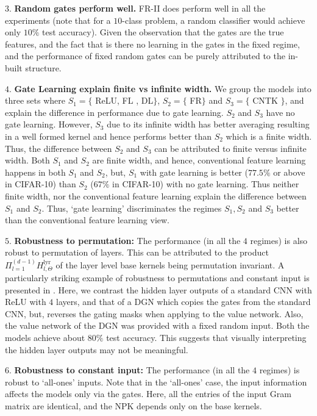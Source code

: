 \indent\quad $3.$ \textbf{Random gates perform well.} FR-II does perform well in all the experiments (note that for a $10$-class problem, a random classifier would achieve only $10\%$ test accuracy). Given the observation that the gates are the true features, and the fact that is there no learning in the gates in the fixed regime, and the performance of fixed random gates can be purely attributed to the in-built structure.

\indent\quad $4.$ \textbf{Gate Learning explain finite vs infinite width.} We group the models into three sets where $S_1=\{$ ReLU, FL , DL$\}$, $S_2=\{$ FR$\}$ and $S_3=\{$ CNTK $\}$, and explain the difference in performance due to gate learning.
 $S_2$ and $S_3$ have no gate learning. However,  $S_3$ due to its infinite width has better averaging resulting in a well formed kernel and hence performs better than $S_2$ which is a finite width. Thus, the difference between $S_2$ and $S_3$ can be attributed to finite versus infinite width. Both $S_1$ and $S_2$ are finite width, and hence, conventional feature learning happens in both $S_1$ and $S_2$, but, $S_1$ with gate learning is better ($77.5\%$ or above in CIFAR-10) than $S_2$ ($67\%$ in CIFAR-10) with no gate learning. Thus neither finite width, nor the conventional feature learning explain the difference between $S_1$ and $S_2$. Thus, `gate learning' discriminates the regimes $S_1, S_2$ and $S_3$ better than the conventional feature learning view.

\indent\quad $5.$ \textbf{Robustness to permutation:} The performance (in all the $4$ regimes) is also robust to permutation of layers. This can be attributed to the product $\Pi_{l=1}^{(d-1)} H^{\text{lyr}}_{l,\Theta}$ of the layer level base kernels being permutation invariant. A particularly striking example of robustness to permutations and constant input is presented in . Here,  we contrast the hidden layer outputs of a standard CNN with ReLU with $4$ layers, and that of a DGN which copies the gates from the standard CNN, but, reverses the gating masks when applying to the value network. Also, the value network of the DGN was provided with a fixed random input. Both the models achieve about $80\%$ test accuracy.  This suggests that visually interpreting the hidden layer outputs may not be meaningful.

\indent\quad $6.$ \textbf{Robustness to constant input:} The performance (in all the $4$ regimes) is  robust to `all-ones' inputs. Note that in the `all-ones' case, the input information affects the models only via the gates. Here, all the entries of the input Gram matrix are identical, and the NPK depends only on the base kernels.


